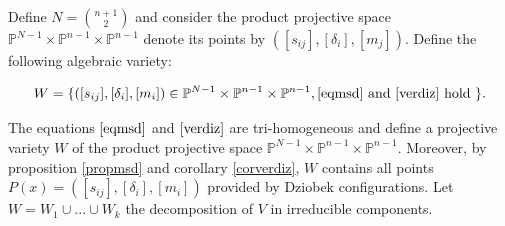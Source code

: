 \documentclass{amsart}
\theoremstyle{definition}
\theoremstyle{remark}
\numberwithin{equation}{section}
\begin{document}










Define $N=\binom{n+1}{2}$ and consider the product projective space $\mathbb{P}^{N-1}\times \mathbb{P}^{n-1}\times \mathbb{P}^{n-1}$ denote its points by $([s_{ij}],[\delta_i],[m_j])$. Define the following algebraic variety:

$$W=\{([s_{ij}],[\delta_i],[m_i]) \in \mathbb{P}^{N-1}\times \mathbb{P}^{n-1}\times \mathbb{P}^{n-1}, \eqref{eqmsd} \text{ and } \eqref{verdiz}  \text{ hold }\}.$$


The equations $\eqref{eqmsd}$ and  $\eqref{verdiz}$  are tri-homogeneous and define a projective variety $W$ of the product projective space $\mathbb{P}^{N-1}\times \mathbb{P}^{n-1}\times \mathbb{P}^{n-1}$. Moreover, by proposition \ref{propmsd} and corollary \ref{corverdiz}, $W$ contains all points $P(x)=([s_{ij}],[\delta_i],[m_i])$ provided by Dziobek configurations. Let $W=W_{1}\cup ... \cup W_{k}$ the decomposition of $V$ in irreducible components.




\end{document}
